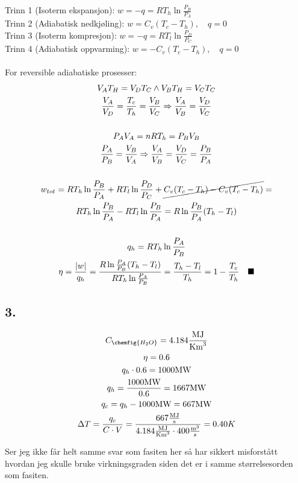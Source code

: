Trinn 1 (Isoterm ekspansjon): \(w = -q = R T_h \ln{\frac{P_B}{P_A}}\)
\\
Trinn 2 (Adiabatisk nedkjøling): \(w = C_v (T_c - T_h),\quad q = 0\)
\\
Trinn 3 (Isoterm kompresjon): \(w = -q = R T_l \ln{\frac{P_D}{P_C}}\)
\\
Trinn 4 (Adiabatisk oppvarming): \(w = - C_v (T_c - T_h),\quad q = 0\)
\\
\\
For reversible adiabatiske prosesser:
\begin{gather*}
	V_A T_H = V_D T_C
	\wedge
	V_B T_H = V_C T_C
	\\
	\frac{V_A}{V_D} = \frac{T_c}{T_h} = \frac{V_B}{V_C} \Rightarrow
	\frac{V_A}{V_B} = \frac{V_D}{V_C}
	\\
	\\
	P_A V_A = n R T_h = P_B V_B
	\\
	\frac{P_A}{P_B} = \frac{V_B}{V_A}
	\Rightarrow
	\frac{V_A}{V_B} = \frac{V_D}{V_C} = \frac{P_B}{P_A}
	\\
	\\
	w_{tot} = R T_h \ln{\frac{P_B}{P_A}} + R T_l \ln{\frac{P_D}{P_C}} +
	\cancel{C_v (T_c - T_h) - C_v (T_c - T_h)} =
	\\
	R T_h \ln{\frac{P_B}{P_A}} - R T_l \ln{\frac{P_B}{P_A}} =
	R \ln{\frac{P_B}{P_A}} (T_h - T_l)
	\\
	\\
	q_h = R T_h \ln{\frac{P_A}{P_B}}
	\\
	\eta = \frac{|w|}{q_h} =
	\frac{R \ln{\frac{P_A}{P_B}} (T_h - T_l)}{R T_h \ln{\frac{P_A}{P_B}}} =
	\frac{T_h - T_l}{T_h} = 1 - \frac{T_c}{T_h}\quad \blacksquare
\end{gather*}


\subsection*{3.}

\begin{gather*}
	C_{\chemfig{H_2O}} = 4.184 \frac{\text{MJ}}{\text{Km}^3}
	\\
	\eta = 0.6
	\\
	q_h \cdot 0.6 = 1000 \text{MW}
	\\
	q_h = \frac{1000 \text{MW}}{0.6} = 1667 \text{MW}
	\\
	q_c = q_h - 1000 \text{MW} = 667 \text{MW}
	\\
	\Delta T = \frac{q_c}{C \cdot V} =
	\frac{667 \frac{\text{MJ}}{\text{s}}}
	{4.184 \frac{\text{MJ}}{\text{Km}^3} \cdot 400 \frac{\text{m}^3}{s}} =
	0.40 K
\end{gather*}

Ser jeg ikke får helt samme svar som fasiten her så har sikkert misforstått hvordan jeg skulle bruke virkningsgraden siden det er i samme størrelsesorden som fasiten.
